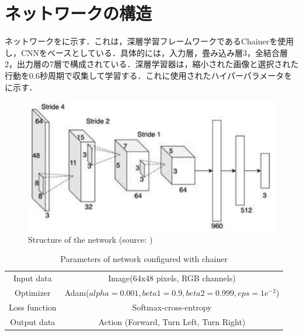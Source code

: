 
\section{ネットワークの構造}

  ネットワークをに示す．これは，深層学習フレームワークであるChainer\cite{chainer}を使用し，CNNをベースとしている．具体的には，入力層，畳み込み層3，全結合層2，出力層の7層で構成されている．深層学習器は，縮小された画像と選択された行動を0.6秒周期で収集して学習する．これに使用されたハイパーパラメータをに示す．

  \begin{figure}[h]
    \centering
    \includegraphics[keepaspectratio, scale=1.10] {images/pdf/okada_network}
    \caption[Structure of the network]{Structure of the network (source: \cite{okada})}
    \label{Fig:okada_network}
  \end{figure}

  \begin{table}[hbtp]
    \caption{Parameters of network configured with chainer}
    \label{tab:Parameters of network configured with chainer}
    \centering
    \begin{tabular}{cc}
      \hline
      Input data & Image(64x48 pixels, RGB channels) \\
      Optimizer & Adam($alpha = 0.001, beta1 = 0.9, beta2 =  0.999, eps = 1e^{-2}$)\\
      Loss function & Softmax-cross-entropy\\
      Output data & Action (Forward, Turn Left, Turn Right)\\
      \hline
    \end{tabular}
  \end{table}

\newpage